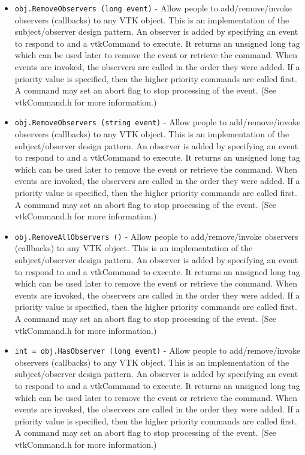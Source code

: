 \begin{itemize}
\item  \verb|obj.RemoveObservers (long event)| -  Allow people to add/remove/invoke observers (callbacks) to any VTK
 object.  This is an implementation of the subject/observer design
 pattern. An observer is added by specifying an event to respond to
 and a vtkCommand to execute. It returns an unsigned long tag which
 can be used later to remove the event or retrieve the command.
 When events are invoked, the observers are called in the order they
 were added. If a priority value is specified, then the higher 
 priority commands are called first. A command may set an abort
 flag to stop processing of the event. (See vtkCommand.h for more
 information.)

\item  \verb|obj.RemoveObservers (string event)| -  Allow people to add/remove/invoke observers (callbacks) to any VTK
 object.  This is an implementation of the subject/observer design
 pattern. An observer is added by specifying an event to respond to
 and a vtkCommand to execute. It returns an unsigned long tag which
 can be used later to remove the event or retrieve the command.
 When events are invoked, the observers are called in the order they
 were added. If a priority value is specified, then the higher 
 priority commands are called first. A command may set an abort
 flag to stop processing of the event. (See vtkCommand.h for more
 information.)

\item  \verb|obj.RemoveAllObservers ()| -  Allow people to add/remove/invoke observers (callbacks) to any VTK
 object.  This is an implementation of the subject/observer design
 pattern. An observer is added by specifying an event to respond to
 and a vtkCommand to execute. It returns an unsigned long tag which
 can be used later to remove the event or retrieve the command.
 When events are invoked, the observers are called in the order they
 were added. If a priority value is specified, then the higher 
 priority commands are called first. A command may set an abort
 flag to stop processing of the event. (See vtkCommand.h for more
 information.)

\item  \verb|int = obj.HasObserver (long event)| -  Allow people to add/remove/invoke observers (callbacks) to any VTK
 object.  This is an implementation of the subject/observer design
 pattern. An observer is added by specifying an event to respond to
 and a vtkCommand to execute. It returns an unsigned long tag which
 can be used later to remove the event or retrieve the command.
 When events are invoked, the observers are called in the order they
 were added. If a priority value is specified, then the higher 
 priority commands are called first. A command may set an abort
 flag to stop processing of the event. (See vtkCommand.h for more
 information.)


\end{itemize}
